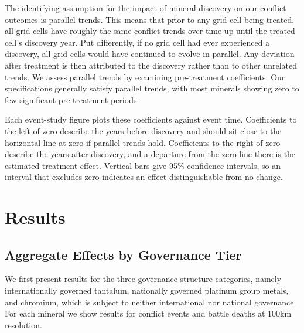 \documentclass[11pt]{article}
\begin{document}
The identifying assumption for the impact of mineral discovery on our conflict outcomes is parallel trends. This means that prior to any grid cell being treated, all grid cells have roughly the same conflict trends over time up until the treated cell's discovery year. Put differently, if no grid cell had ever experienced a discovery, all grid cells would have continued to evolve in parallel. Any deviation after treatment is then attributed to the discovery rather than to other unrelated trends. We assess parallel trends by examining pre-treatment coefficients. Our specifications generally satisfy parallel trends, with most minerals showing zero to few significant pre-treatment periods.

Each event-study figure plots these coefficients against event time. Coefficients to the left of zero describe the years before discovery and should sit close to the horizontal line at zero if parallel trends hold. Coefficients to the right of zero describe the years after discovery, and a departure from the zero line there is the estimated treatment effect. Vertical bars give 95\% confidence intervals, so an interval that excludes zero indicates an effect distinguishable from no change.

\section{Results}
\label{sec:results}

\subsection{Aggregate Effects by Governance Tier}

We first present results for the three governance structure categories, namely internationally governed tantalum, nationally governed platinum group metals, and chromium, which is subject to neither international nor national governance. For each mineral we show results for conflict events and battle deaths at 100km resolution.
\end{document}
